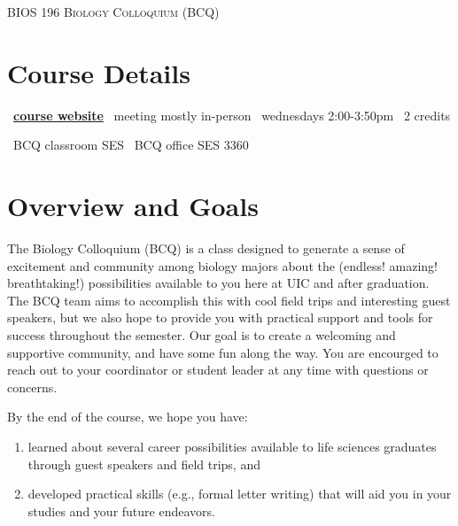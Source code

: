 \documentclass[12pt]{article}
\let\oldhref\href
\renewcommand{\href}[2]{\oldhref{#1}{\bfseries#2}}
\begin{document}
\begin{center}
  \textsc{\large{BIOS 196 Biology Colloquium (BCQ)}}
  \end{center}


\section{Course Details}

\begin{center}

\faLaptop\ \href{https://ledelaney.org/teaching/2021/bcq}{course website} \hspace{3mm} \faSchool\ meeting mostly in-person \hspace{3mm} \faClock\ wednesdays 2:00-3:50pm \hspace{3mm} \faCreditCard\  2 credits  

\faCompass\ BCQ classroom SES \hspace{1.5mm}  \faCompass\ BCQ office SES 3360
  
\end{center}

\section{Overview and Goals}

The Biology Colloquium (BCQ) is a class designed to generate a sense of excitement and community among biology majors about the (endless! amazing! breathtaking!) possibilities available to you here at UIC and after graduation. The BCQ team aims to accomplish this with cool field trips and interesting guest speakers, but we also hope to provide you with practical support and tools for success throughout the semester. Our goal is to create a welcoming and supportive community, and have some fun along the way. You are encourged to reach out to your coordinator or student leader at any time with questions or concerns.

By the end of the course, we hope you have:

\begin{enumerate}
  \item{learned about several career possibilities available to life sciences graduates through guest speakers and field trips, and}
  \item {developed practical skills (e.g., formal letter writing) that will aid you in your studies and your future endeavors.}
\end{enumerate}
\end{document}

